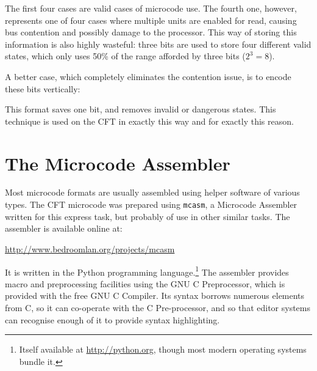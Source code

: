 The first four cases are valid cases of microcode use. The fourth one,
however, represents one of four cases where multiple units are enabled
for read, causing bus contention and possibly damage to the
processor. This way of storing this information is also highly
wasteful: three bits are used to store four different valid states,
which only uses 50\% of the range afforded by three bits ($2^3 = 8$).

A better case, which completely eliminates the contention issue, is to
encode these bits vertically:


This format saves one bit, and removes invalid or dangerous
states. This technique is used on the CFT in exactly this way and for
exactly this reason.


\section{The Microcode Assembler}

Most microcode formats are usually assembled using helper software of
various types.  The CFT microcode was prepared using \texttt{mcasm}, a
Microcode Assembler written for this express task, but probably of use
in other similar tasks. The assembler is available online at:

\begin{center}
  \url{http://www.bedroomlan.org/projects/mcasm}
\end{center}

It is written in the Python programming language.\footnote{Itself available at
  \url{http://python.org}, though most modern operating systems bundle it.} The
assembler provides macro and preprocessing facilities using the GNU C
Preprocessor, which is provided with the free GNU C Compiler. Its syntax
borrows numerous elements from C, so it can co-operate with the C
Pre-processor, and so that editor systems can recognise enough of it to provide
syntax highlighting.

